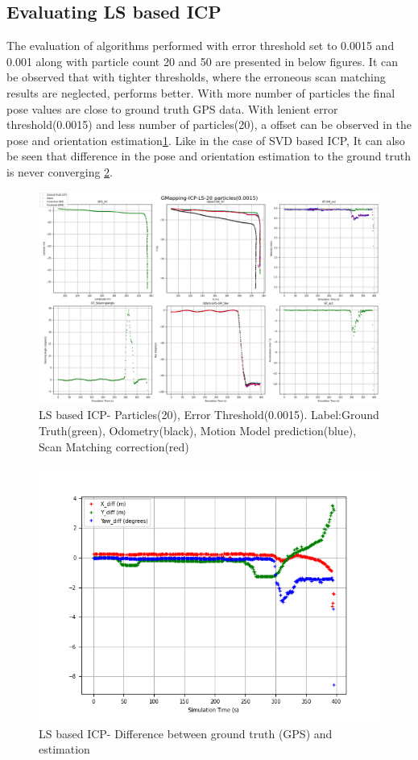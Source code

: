 \subsection{Evaluating LS based ICP}
The evaluation of algorithms performed with error threshold set to 0.0015 and  0.001 along with particle count 20 and 50 are presented in below figures. It can be observed that with tighter thresholds, where the erroneous scan matching results are neglected, performs better. With more number of particles the final pose values are close to ground truth GPS data.
With lenient error threshold(0.0015) and less number of particles(20), a offset can be observed in the pose and orientation estimation\ref{fig:LS_20_0.0025}. Like in the case of SVD based ICP, It can also be seen that difference in the pose and orientation estimation to the ground truth is never converging \ref{fig:LS_20_0.0025_diff}.
    \begin{figure}[h] 
        \includegraphics[height=0.6\textwidth]{images/GMapping-ICP-LS-20 particles(0.0015)_PositionParameters.png}
        \caption{LS based ICP- Particles(20), Error Threshold(0.0015). Label:Ground Truth(green), Odometry(black), Motion Model prediction(blue), Scan Matching correction(red)}
        \label{fig:LS_20_0.0025}
    \end{figure}
    \begin{figure}[h] 
        \includegraphics[height=0.4\textwidth]{images/GMapping-ICP-LS-20 particles(0.0015)_True_vs_Crct.png}
        \caption{LS based ICP- Difference between ground truth (GPS) and estimation}
        \label{fig:LS_20_0.0025_diff}
    \end{figure}
